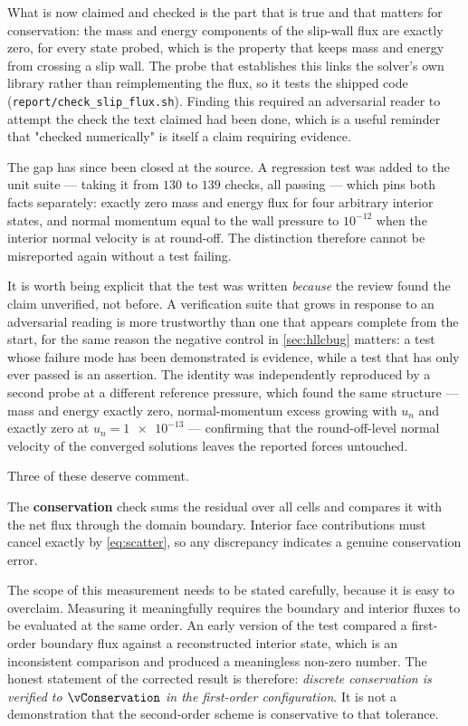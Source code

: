What is now claimed and checked is the part that is true and that matters for
conservation: the mass and energy components of the slip-wall flux are exactly zero, for
every state probed, which is the property that keeps mass and energy from crossing a
slip wall.
The probe that establishes this links the solver's own library rather than
reimplementing the flux, so it tests the shipped code
(\texttt{report/check\_slip\_flux.sh}). Finding this required an adversarial reader to
attempt the check the text claimed had been done, which is a useful reminder that
"checked numerically" is itself a claim requiring evidence.

The gap has since been closed at the source. A regression test was added to the unit
suite --- taking it from $130$ to $139$ checks, all passing --- which pins both facts
separately: exactly zero mass and energy flux for four arbitrary interior states, and
normal momentum equal to the wall pressure to $10^{-12}$ when the interior normal
velocity is at round-off. The distinction therefore cannot be misreported again without
a test failing.

It is worth being explicit that the test was written \emph{because} the review found the
claim unverified, not before. A verification suite that grows in response to an
adversarial reading is more trustworthy than one that appears complete from the start,
for the same reason the negative control in \cref{sec:hllcbug} matters: a test whose
failure mode has been demonstrated is evidence, while a test that has only ever passed
is an assertion. The identity was independently reproduced by a second probe at a
different reference pressure, which found the same structure --- mass and energy exactly
zero, normal-momentum excess growing with $u_n$ and exactly zero at
$u_n=\num{1e-13}$ --- confirming that the round-off-level normal velocity of the
converged solutions leaves the reported forces untouched.

Three of these deserve comment.

The \textbf{conservation} check sums the residual over all cells and compares it
with the net flux through the domain boundary. Interior face contributions must
cancel exactly by \cref{eq:scatter}, so any discrepancy indicates a genuine
conservation error.

The scope of this measurement needs to be stated carefully, because it is easy to
overclaim. Measuring it meaningfully requires the boundary and interior fluxes to
be evaluated at the same order. An early version of the test compared a
first-order boundary flux against a reconstructed interior state, which is an
inconsistent comparison and produced a meaningless non-zero number. The honest
statement of the corrected result is therefore: \emph{discrete conservation is
verified to $\vConservation$ in the first-order configuration}. It is not a
demonstration that the second-order scheme is conservative to that tolerance.

